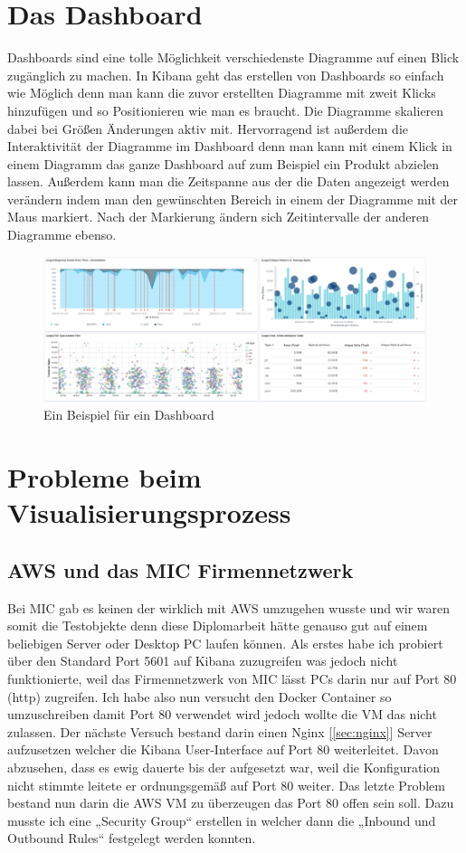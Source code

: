 \section{Das Dashboard}
Dashboards sind eine tolle Möglichkeit verschiedenste Diagramme auf einen Blick zugänglich zu machen. In Kibana geht das erstellen von Dashboards so einfach wie Möglich denn man kann die zuvor erstellten Diagramme mit zweit Klicks hinzufügen und so Positionieren wie man es braucht. Die Diagramme skalieren dabei bei Größen Änderungen aktiv mit. Hervorragend ist außerdem die Interaktivität der Diagramme im Dashboard denn man kann mit einem Klick in einem Diagramm das ganze Dashboard auf zum Beispiel ein Produkt abzielen lassen. Außerdem kann man die Zeitspanne aus der die Daten angezeigt werden verändern indem man den gewünschten Bereich in einem der Diagramme mit der Maus markiert. Nach der Markierung ändern sich Zeitintervalle der anderen Diagramme ebenso.
\begin{figure}[H] 
    \centering
    \includegraphics[scale=0.9]{images/dashboard.png}
    \caption{Ein Beispiel für ein Dashboard}
\end{figure}
\section{Probleme beim Visualisierungsprozess}
\subsection{AWS und das MIC Firmennetzwerk}
Bei MIC gab es keinen der wirklich mit AWS umzugehen wusste und wir waren somit die Testobjekte denn diese Diplomarbeit hätte genauso gut auf einem beliebigen Server oder Desktop PC laufen können. Als erstes habe ich probiert über den Standard Port 5601 auf Kibana zuzugreifen was jedoch nicht funktionierte, weil das Firmennetzwerk von MIC lässt PCs darin nur auf Port 80 (http) zugreifen. Ich habe also nun versucht den Docker Container so umzuschreiben damit Port 80 verwendet wird jedoch wollte die VM das nicht zulassen. Der nächste Versuch bestand darin einen Nginx [\ref{sec:nginx}] Server aufzusetzen welcher die Kibana User-Interface auf Port 80 weiterleitet. Davon abzusehen, dass es ewig dauerte bis der aufgesetzt war, weil die Konfiguration nicht stimmte leitete er ordnungsgemäß auf Port 80 weiter. Das letzte Problem bestand nun darin die AWS VM zu überzeugen das Port 80 offen sein soll. Dazu musste ich eine „Security Group“ erstellen in welcher dann die „Inbound und Outbound Rules“ festgelegt werden konnten. 
